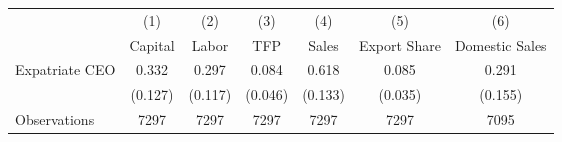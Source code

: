 \begin{tabular}{l*{6}{c}}
\hline\hline
                    &\multicolumn{1}{c}{(1)}&\multicolumn{1}{c}{(2)}&\multicolumn{1}{c}{(3)}&\multicolumn{1}{c}{(4)}&\multicolumn{1}{c}{(5)}&\multicolumn{1}{c}{(6)}\\
                    &\multicolumn{1}{c}{Capital}&\multicolumn{1}{c}{Labor}&\multicolumn{1}{c}{TFP}&\multicolumn{1}{c}{Sales}&\multicolumn{1}{c}{Export Share}&\multicolumn{1}{c}{Domestic Sales}\\
\hline
Expatriate CEO      &       0.332&       0.297&       0.084&       0.618&       0.085&       0.291\\
                    &     (0.127)&     (0.117)&     (0.046)&     (0.133)&     (0.035)&     (0.155)\\
\hline
Observations        &        7297&        7297&        7297&        7297&        7297&        7095\\
\hline\hline
\end{tabular}
